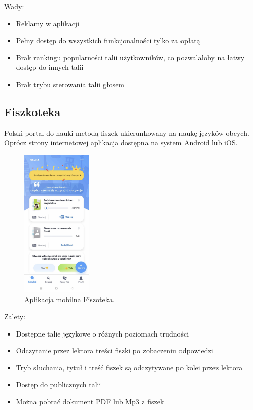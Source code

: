 Wady:
\begin{itemize}
    \item Reklamy w aplikacji
    \item Pełny dostęp do wszystkich funkcjonalności tylko za opłatą
    \item Brak rankingu popularności talii użytkowników, co pozwalałoby na łatwy dostęp do innych talii
    \item Brak trybu sterowania talii głosem
\end{itemize}

\subsection{Fiszkoteka}

Polski portal do nauki metodą fiszek ukierunkowany na naukę języków obcych. Oprócz strony internetowej aplikacja dostępna na system Android lub iOS.

\begin{figure}[H]
    \centering
    \includegraphics[width=0.3\textwidth]{chapters/chapter_3/fiszoteka}
    \caption{Aplikacja mobilna Fiszoteka.}
    \label{img:fiszoteka}
\end{figure}

Zalety:
\begin{itemize}
    \item Dostępne talie językowe o różnych poziomach trudności
    \item Odczytanie przez lektora treści fiszki po zobaczeniu odpowiedzi
    \item Tryb słuchania, tytuł i treść fiszek są odczytywane po kolei przez lektora
    \item Dostęp do publicznych talii
    \item Można pobrać dokument PDF lub Mp3 z fiszek
\end{itemize}

